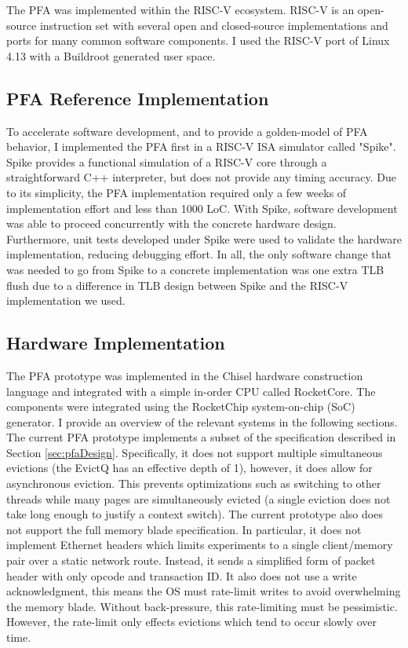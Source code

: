 The PFA was implemented within the RISC-V ecosystem. RISC-V is an open-source
instruction set with several open and closed-source implementations and ports
for many common software components\cite{riscv}. I used the RISC-V port of
Linux 4.13 with a Buildroot generated user space.

\subsection{PFA Reference Implementation}
To accelerate software development, and to provide a golden-model of
PFA behavior, I implemented the PFA first in a RISC-V ISA simulator called
"Spike"\cite{spike}. Spike provides a functional simulation of a RISC-V core
through a straightforward C++ interpreter, but does not provide any timing
accuracy. Due to its simplicity, the PFA implementation required only a few
weeks of implementation effort and less than 1000 LoC. With Spike, software
development was able to proceed concurrently with the concrete hardware design.
Furthermore, unit tests developed under Spike were used to validate the
hardware implementation, reducing debugging effort. In all, the only software
change that was needed to go from Spike to a concrete implementation was one
extra TLB flush due to a difference in TLB design between Spike and the RISC-V
implementation we used.

\subsection{Hardware Implementation}
The PFA prototype was implemented in the Chisel hardware construction
language\cite{chisel} and integrated with a simple in-order CPU called
RocketCore\cite{rocketchip}. The components were integrated using the
RocketChip system-on-chip (SoC) generator\cite{rocketchip}. I provide an
overview of the relevant systems in the following sections. The current PFA
prototype implements a subset of the specification described in Section
\ref{sec:pfaDesign}. Specifically, it does not support multiple simultaneous
evictions (the EvictQ has an effective depth of 1), however, it does allow for
asynchronous eviction. This prevents optimizations such as switching to other
threads while many pages are simultaneously evicted (a single eviction does not
take long enough to justify a context switch). The current prototype also does
not support the full memory blade specification. In particular, it does not
implement Ethernet headers which limits experiments to a single client/memory
pair over a static network route. Instead, it sends a simplified form of packet
header with only opcode and transaction ID. It also does not use a write
acknowledgment, this means the OS must rate-limit writes to avoid overwhelming
the memory blade. Without back-pressure, this rate-limiting must be
pessimistic.  However, the rate-limit only effects evictions which tend to
occur slowly over time.
 
